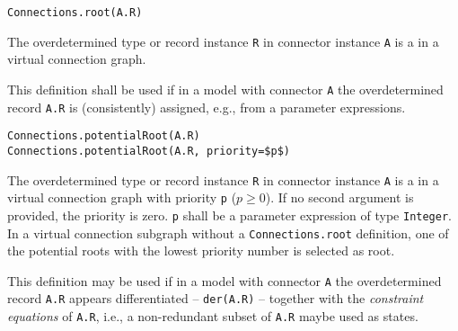 \begin{operatordefinition}
\begin{synopsis}\begin{lstlisting}
Connections.root(A.R)
\end{lstlisting}\end{synopsis}
\begin{semantics}
The overdetermined type or record instance \lstinline!R! in connector instance \lstinline!A! is a  in a virtual connection graph.

\begin{nonnormative}
This definition shall be used if in a model with connector \lstinline!A! the overdetermined record \lstinline!A.R! is (consistently) assigned, e.g., from a parameter expressions.
\end{nonnormative}
\end{semantics}
\end{operatordefinition}

\begin{operatordefinition}
\begin{synopsis}\begin{lstlisting}
Connections.potentialRoot(A.R)
Connections.potentialRoot(A.R, priority=$p$)
\end{lstlisting}\end{synopsis}
\begin{semantics}
The overdetermined type or record instance \lstinline!R! in connector instance \lstinline!A! is a  in a virtual connection graph with priority \lstinline!p! ($p \geq 0$).
If no second argument is provided, the priority is zero.
\lstinline!p! shall be a parameter expression of type \lstinline!Integer!.
In a virtual connection subgraph without a \lstinline!Connections.root! definition, one of the potential roots with the lowest priority number is selected as root.

\begin{nonnormative}
This definition may be used if in a model with connector \lstinline!A! the overdetermined record \lstinline!A.R! appears differentiated -- \lstinline!der(A.R)! -- together with the \emph{constraint equations} of \lstinline!A.R!, i.e., a non-redundant subset of \lstinline!A.R! maybe used as states.
\end{nonnormative}
\end{semantics}
\end{operatordefinition}

